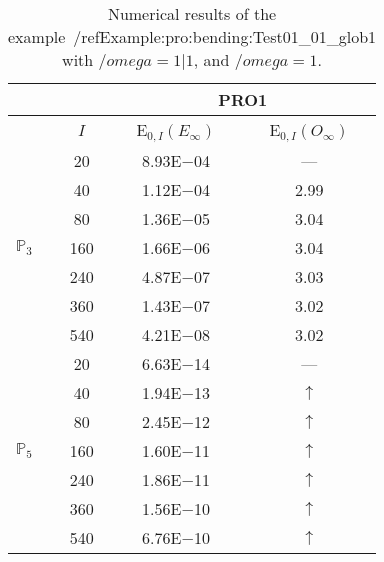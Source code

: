 \begin{table}[H]
\caption{Numerical results of the example~/ref{Example:pro:bending:Test01_01_glob1} with $/omega=1|1$, and $/omega=1$.}
\setlength{\tabcolsep}{5pt}
\centering
\begin{tabular}{@{}l c c c@{}}
\toprule
 &  & \multicolumn{2}{c}{PRO1}\\
\midrule
 & $I$ & E$_{0,I}(E_{\infty})$ & E$_{0,I}(O_{\infty})$\\
\midrule
\multirow{7}{*}{$\mathbb{P}_{3}$}
 & 20 & 8.93E$-$04 & ---\\
 & 40 & 1.12E$-$04 & 2.99\\
 & 80 & 1.36E$-$05 & 3.04\\
 & 160 & 1.66E$-$06 & 3.04\\
 & 240 & 4.87E$-$07 & 3.03\\
 & 360 & 1.43E$-$07 & 3.02\\
 & 540 & 4.21E$-$08 & 3.02\\
\midrule
\multirow{7}{*}{$\mathbb{P}_{5}$}
 & 20 & 6.63E$-$14 & ---\\
 & 40 & 1.94E$-$13 & $\uparrow$\\
 & 80 & 2.45E$-$12 & $\uparrow$\\
 & 160 & 1.60E$-$11 & $\uparrow$\\
 & 240 & 1.86E$-$11 & $\uparrow$\\
 & 360 & 1.56E$-$10 & $\uparrow$\\
 & 540 & 6.76E$-$10 & $\uparrow$\\
\bottomrule
\end{tabular}
\label{Table:pRO:test_01_01_test9_pro3}
\end{table}
